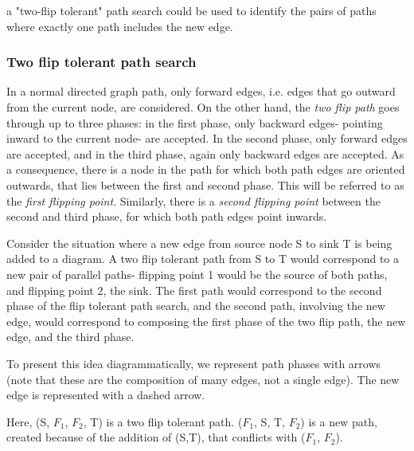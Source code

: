 \documentclass{article}
\begin{document}
a "two-flip tolerant" path search could be used to identify the pairs of paths where exactly one path includes the new edge. 

\subsubsection{Two flip tolerant path search}
In a normal directed graph path, only forward edges, i.e. edges that go outward from the current node, are considered. 
On the other hand, the \textit{two flip path} goes through up to three phases: in the first phase, only backward edges- pointing inward to the current node- are accepted. In the second phase, only forward edges are accepted, and in the third phase, again only backward edges are accepted. As a consequence, there is a node in the path for which both path edges are oriented outwards, that lies between the first and second phase. This will be referred to as the \textit{first flipping point}. Similarly, there is a \textit{second flipping point} between the second and third phase, for which both path edges point inwards.

Consider the situation where a new edge from source node S to sink T is being added to a diagram.
A two flip tolerant path from S to T would correspond to a new pair of parallel paths- flipping point 1 would be the source of both paths, and flipping point 2, the sink. The first path would correspond to the second phase of the flip tolerant path search, and the second path, involving the new edge, would correspond to composing the first phase of the two flip path, the new edge, and the third phase.

To present this idea diagrammatically, we represent path phases with arrows (note that these are the composition of many edges, not a single edge). The new edge is represented with a dashed arrow.

\begin{center}
\end{center}
Here, (S, $F_1$, $F_2$, T) is a two flip tolerant path. ($F_1$, S, T, $F_2$) is a new path, created because of the addition of (S,T), that conflicts with ($F_1$, $F_2$).
\end{document}
